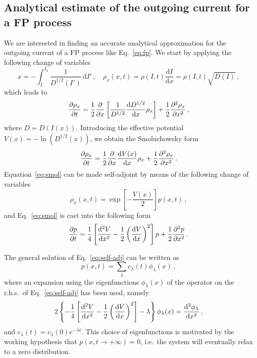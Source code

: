 {\begin{chapterappendices}

\subsection{Analytical estimate of the outgoing current for a FP process}
\label{app_sec:analytic_estimate_of_the_current_loss}


We are interested in finding an accurate analytical approximation for the outgoing current of a FP process like Eq.~\eqref{eq:fp}. We start by applying the following change of variables
\begin{equation}
    x = -\int_I^{I_\mathrm{a}} \frac{1}{D^{1/2}(I')}\,\mathrm{d}I'\,,\quad \rho_x(x,t)=\rho(I,t)\frac{\mathrm{d}I}{\mathrm{d}x}=\rho(I,t)\sqrt{D(I)} \, ,
\end{equation}
which leads to
\begin{equation}
    \pdv{\rho_x}{t} = \frac{1}{2}\pdv{x} \left[\frac{1}{D^{1/2}}\dv{D^{1/2}}{x}\rho_x\right]+\frac{1}{2}\pdv[2]{\rho_x}{x}\, ,
\end{equation}
where $D=D\left(I(x)\right)$. Introducing the effective potential $V(x)=-\ln(D^{1/2}(x))$, we obtain the Smoluchowsky form~\cite{hannes1996fokker}
\begin{equation}
    \pdv{\rho_x}{t} = \frac{1}{2}\pdv{x} \dv{V(x)}{x} \rho_x+\frac{1}{2}\pdv[2]{\rho_x}{x}\, .
    \label{eq:smol}
\end{equation}
Equation~\eqref{eq:smol} can be made self-adjoint by means of the following change of variables 
\begin{equation}
    \rho_x(x,t) = \exp\left[-\frac{V(x)}{2}\right]p(x,t) \, ,
\end{equation}
and Eq.~\eqref{eq:smol} is cast into the following form
\begin{equation}
    \pdv{p}{t} = \frac{1}{4}\left[\dv[2]{V}{x} - \frac{1}{2}\left(\dv{V}{x}\right)^2\right]p + \frac{1}{2}\pdv[2]{p}{x}\,.
    \label{eq:self-adj}
\end{equation}

The general solution of Eq.~\eqref{eq:self-adj} can be written as
\begin{equation}
    p(x,t) = \sum_\lambda c_\lambda(t)\phi_\lambda(x)\,,
    \label{eq:expansion}
\end{equation}
where an expansion using the eigenfunctions $\phi_\lambda(x)$ of the operator on the r.h.s.\ of Eq.~\eqref{eq:self-adj} has been used, namely 
\begin{equation}
    2\left\{-\frac{1}{4}\left[\dv[2]{V}{x} - \frac{1}{2}\left(\dv{V}{x}\right)^2\right] - \lambda \right\}\phi_\lambda(x) = \dv[2]{\phi_\lambda}{x}\,,
    \label{eq:eigenproblem}
\end{equation}
and $c_\lambda(t) = c_\lambda(0)e^{-\lambda t}$. This choice of eigenfunctions is motivated by the working hypothesis that $p(x,t\to+\infty)=0$, i.e.\ the system will eventually relax to a zero distribution.


\end{chapterappendices}}
